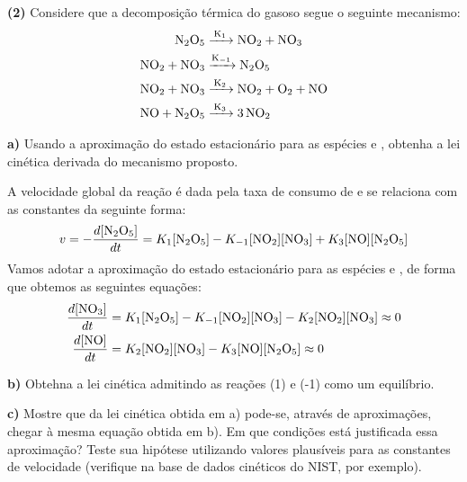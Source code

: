 \textbf{(2)} Considere que a decomposição térmica do  gasoso segue o seguinte mecanismo:
\begin{align*}
    \ce{N2O5 &->[{K_1}] NO2 + NO3}\\
    \ce{NO2 + NO3 &->[{K_{-1}}] N2O5}\\
    \ce{NO2 + NO3 &->[{K_2}] NO2 + O2 + NO}\\
    \ce{NO + N2O5 &->[{K_3}] 3NO2}
\end{align*}

\textbf{a)} Usando a aproximação do estado estacionário para as espécies  e , obtenha a lei cinética derivada do mecanismo proposto.

A velocidade global da reação é dada pela taxa de consumo de  e se relaciona com as constantes da seguinte forma:
\begin{align*}
    v = - \frac{d[\ce{N2O5}]}{dt} = K_1 [\ce{N2O5}] - K_{-1} [\ce{NO2}][\ce{NO3}] + K_3 [\ce{NO}][\ce{N2O5}]
\end{align*}
Vamos adotar a aproximação do estado estacionário para as espécies  e , de forma que obtemos as seguintes equações:
\begin{align*}
    \frac{d[\ce{NO3}]}{dt} &= K_1 [\ce{N2O5}] - K_{-1} [\ce{NO2}][\ce{NO3}] - K_2 [\ce{NO2}][\ce{NO3}] \approx 0\\
    \frac{d[\ce{NO}]}{dt} &= K_2 [\ce{NO2}][\ce{NO3}] - K_3 [\ce{NO}][\ce{N2O5}] \approx 0
\end{align*}

\textbf{b)} Obtehna a lei cinética admitindo as reações (1) e (-1) como um equilíbrio.

\textbf{c)} Mostre que da lei cinética obtida em a) pode-se, através de aproximações, chegar à mesma equação obtida em b). Em que condições está justificada essa aproximação? Teste sua hipótese utilizando valores plausíveis para as constantes de velocidade (verifique na base de dados cinéticos do NIST, por exemplo).
